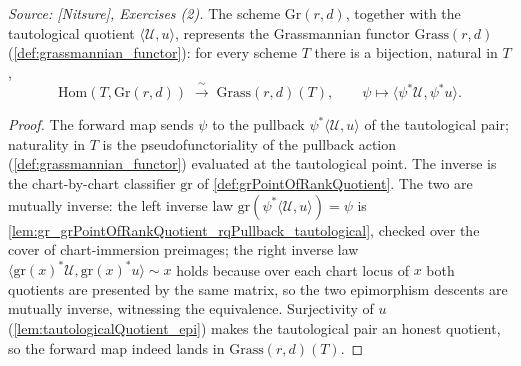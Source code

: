 \begin{theorem}
  \label{thm:grassmannian_universal_property}
  \textit{Source: [Nitsure], Exercises (2).}
  The scheme \(\mathrm{Gr}(r,d)\), together with the tautological quotient
  \(\langle \mathcal{U}, u\rangle\), represents the Grassmannian functor
  \(\mathrm{Grass}(r,d)\) (\cref{def:grassmannian_functor}): for every scheme \(T\) there is a
  bijection, natural in \(T\),
  \[
    \mathrm{Hom}(T, \mathrm{Gr}(r,d)) \;\xrightarrow{\ \sim\ }\; \mathrm{Grass}(r,d)(T),
    \qquad \psi \longmapsto \langle \psi^{*}\mathcal{U}, \psi^{*}u\rangle .
  \]
\end{theorem}
\begin{proof}
    \leanok
  The forward map sends \(\psi\) to the pullback \(\psi^{*}\langle\mathcal{U},u\rangle\) of the
  tautological pair; naturality in \(T\) is the pseudofunctoriality of the pullback action
  (\cref{def:grassmannian_functor}) evaluated at the tautological point. The inverse is the
  chart-by-chart classifier \(\mathrm{gr}\) of \cref{def:grPointOfRankQuotient}. The two are
  mutually inverse: the left inverse law
  \(\mathrm{gr}(\psi^{*}\langle\mathcal{U},u\rangle) = \psi\) is
  \cref{lem:gr_grPointOfRankQuotient_rqPullback_tautological}, checked over the cover of
  chart-immersion preimages; the right inverse law
  \(\langle\mathrm{gr}(x)^{*}\mathcal{U}, \mathrm{gr}(x)^{*}u\rangle \sim x\) holds because over
  each chart locus of \(x\) both quotients are presented by the same matrix, so the two
  epimorphism descents are mutually inverse, witnessing the equivalence. Surjectivity of \(u\)
  (\cref{lem:tautologicalQuotient_epi}) makes the tautological pair an honest quotient, so the
  forward map indeed lands in \(\mathrm{Grass}(r,d)(T)\).
\end{proof}


